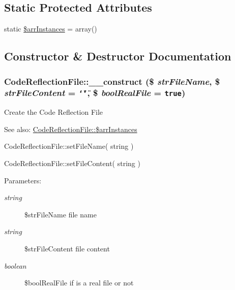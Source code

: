 \subsection*{Static Protected Attributes}
\begin{CompactItemize}
\item 
static \hyperlink{class_code_reflection_file_019a4ce9092e6ea5f4e51e131e3a0352}{\$arrInstances} = array()
\end{CompactItemize}


\subsection{Constructor \& Destructor Documentation}
\hypertarget{class_code_reflection_file_85d5cd6390afa77ea3d3e67b8ebc762d}{
\subsubsection[{\_\-\_\-construct}]{\setlength{\rightskip}{0pt plus 5cm}CodeReflectionFile::\_\-\_\-construct (\$ {\em strFileName}, \/  \$ {\em strFileContent} = {\tt \char`\"{}\char`\"{}}, \/  \$ {\em boolRealFile} = {\tt true})}}
\label{class_code_reflection_file_85d5cd6390afa77ea3d3e67b8ebc762d}


Create the Code Reflection File

\begin{Desc}
\item[See also:]\hyperlink{class_code_reflection_file_019a4ce9092e6ea5f4e51e131e3a0352}{CodeReflectionFile::\$arrInstances} 

CodeReflectionFile::setFileName( string ) 

CodeReflectionFile::setFileContent( string ) \end{Desc}
\begin{Desc}
\item[Parameters:]
\begin{description}
\item[{\em string}]\$strFileName file name \item[{\em string}]\$strFileContent file content \item[{\em boolean}]\$boolRealFile if is a real file or not \end{description}
\end{Desc}


